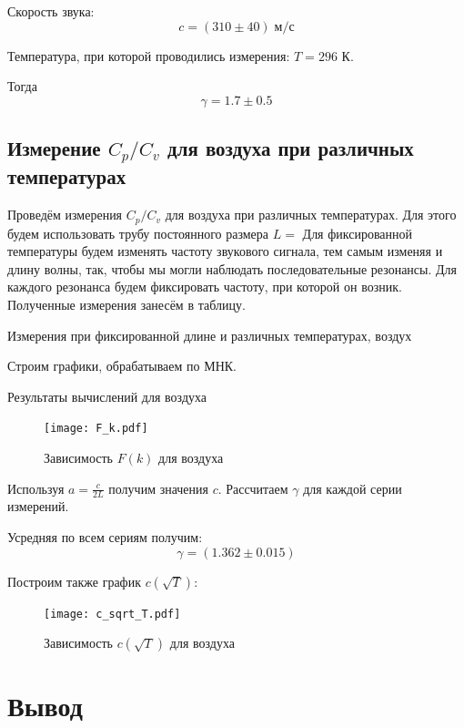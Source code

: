 \documentclass[12pt,a4paper]{article}
\begin{document}
		Скорость звука:
			$$c = (310 \pm 40) \; \text{м/с}$$
		
		Температура, при которой проводились измерения: $T = 296$ К.
		
		Тогда
			$$\gamma = 1.7 \pm 0.5$$
		
		\subsection*{Измерение $C_p/C_v$ для воздуха при различных температурах}
		
		Проведём измерения $C_p/C_v$ для воздуха при различных температурах.
		Для этого будем использовать трубу постоянного размера $L = $
		Для фиксированной температуры будем изменять частоту звукового сигнала, тем самым изменяя и длину волны, так, чтобы мы могли наблюдать последовательные резонансы.
		Для каждого резонанса будем фиксировать частоту, при которой он возник.
		Полученные измерения занесём в таблицу.
		
		\begin{table}[H]
			\caption{Измерения при фиксированной длине и различных температурах, воздух}
			
		\end{table}
		
		Строим графики, обрабатываем по МНК.
	
		\begin{table}[H]
			\caption{Результаты вычислений для воздуха}
			
		\end{table}
		
		\begin{figure}[H]
			\texttt{[image: F\_k.pdf]}
			\caption{Зависимость $F(k)$ для воздуха}
		\end{figure}
		
		Используя $a = \frac{c}{2L}$ получим значения $c$.
		Рассчитаем $\gamma$ для каждой серии измерений.
		
		Усредняя по всем сериям получим:
			$$\gamma = (1.362 \pm 0.015)$$
		
		Построим также график $c(\sqrt{T})$:
		
		\begin{figure}[H]
			\texttt{[image: c\_sqrt\_T.pdf]}
			\caption{Зависимость $c(\sqrt{T})$ для воздуха}
		\end{figure}
		
		
	\section*{Вывод}
	
\end{document}

